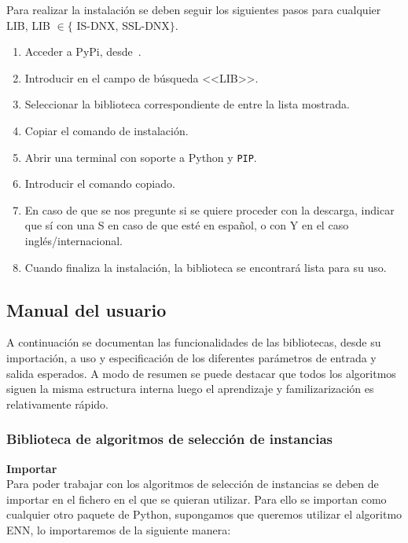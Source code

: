 Para realizar la instalación se deben seguir los siguientes pasos para cualquier LIB, LIB $\in \lbrace$ IS-DNX, SSL-DNX$\rbrace$.

\begin{enumerate}
\item Acceder a PyPi, desde~\cite{PyPI}.
\item Introducir en el campo de búsqueda <<LIB>>.
\item Seleccionar la biblioteca correspondiente de entre la lista mostrada.
\item Copiar el comando de instalación.
\item Abrir una terminal con soporte a Python y \texttt{PIP}.
\item Introducir el comando copiado.
\item En caso de que se nos pregunte si se quiere proceder con la descarga, indicar que sí con una S en caso de que esté en español, o con Y en el caso inglés/internacional.
\item Cuando finaliza la instalación, la biblioteca se encontrará lista para su uso.
\end{enumerate}



\subsection{Manual del usuario}

A continuación se documentan las funcionalidades de las bibliotecas, desde su importación, a uso y especificación de los diferentes parámetros de entrada y salida esperados. A modo de resumen se puede destacar que todos los algoritmos siguen la misma estructura interna luego el aprendizaje y familizarización es relativamente rápido.

\subsubsection{Biblioteca de algoritmos de selección de instancias}
\textbf{Importar}\\
Para poder trabajar con los algoritmos de selección de instancias se deben de importar en el fichero en el que se quieran utilizar. Para ello se importan como cualquier otro paquete de Python, supongamos que queremos utilizar el algoritmo ENN, lo importaremos de la siguiente manera:

